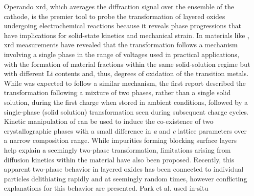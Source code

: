 \documentclass{article}
\begin{document}



Operando \gls{xrd}, which averages the diffraction signal over the
ensemble of the cathode, is the premier tool to probe the
transformation of layered oxides undergoing electrochemical reactions
because it reveals phase progressions that have implications for
solid-state kinetics and mechanical strain.  In \nmc{} materials like
\nmc[333]{}, \gls{xrd} measurements have revealed that the
transformation follows a mechanism involving a single phase in the
range of voltages used in practical
applications\cite{hulzen2018,ahn2017,zhou2016-2}, with the formation
of material fractions within the same solid-solution regime but with
different Li contents and, thus, degrees of oxidation of the
transition metals. While \nca{} was expected to follow a similar
mechanism, the first report described the transformation following a
mixture of two phases, rather than a single solid solution, during the
first charge when stored in ambient conditions, followed by a
single-phase (solid solution) transformation seen during subsequent
charge cycles\cite{robert2015}. Kinetic manipulation of \nmc[333]{}
can be used to induce the co-existence of two crystallographic phases
with a small difference in \emph{a} and \emph{c} lattice parameters
over a narrow composition range\cite{yoon2006,hua2018}. While
impurities forming blocking surface layers help explain a seemingly
two-phase transformation\cite{grenier2017}, limitations arising from
diffusion kinetics within the material have also been
proposed\cite{chapman2020}. Recently, this apparent two-phase behavior
in layered oxides has been connected to individual particles
delithiating rapidly and at seemingly random times\cite{chueh2021,
  zhao2022, rao2021, wang2020-6}, however conflicting explanations for
this behavior are presented. Park et al. \cite{chueh2021} used in-situ
\end{document}
